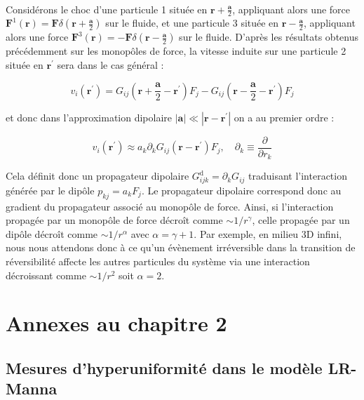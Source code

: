 \subparagraph{}Considérons le choc d'une particule 1 située en $\mathbf{r}+\frac{\mathbf{a}}{2}$, appliquant alors une force $\mathbf{F}^1(\mathbf{r})=\mathbf{F}\delta(\mathbf{r}+\frac{\mathbf{a}}{2})$ sur le fluide, et une particule 3 située en $\mathbf{r}-\frac{\mathbf{a}}{2}$, appliquant alors une force $\mathbf{F}^3(\mathbf{r})=-\mathbf{F}\delta(\mathbf{r}-\frac{\mathbf{a}}{2})$ sur le fluide. D'après les résultats obtenus précédemment sur les monopôles de force, la vitesse induite sur une particule 2 située en $\mathbf{r}^\prime$ sera dans le cas général :

\begin{equation}
	v_i (\mathbf{r}^\prime) = G_{ij}(\mathbf{r}+\frac{\mathbf{a}}{2} -\mathbf{r}^\prime)F_j - G_{ij}(\mathbf{r}-\frac{\mathbf{a}}{2} -\mathbf{r}^\prime)F_j
\end{equation}

\noindent et donc dans l'approximation dipolaire $|\mathbf{a}|\ll |\mathbf{r}-\mathbf{r}^\prime|$ on a au premier ordre :

\begin{equation}
	v_i (\mathbf{r}^\prime) \approx a_k\partial_k G_{ij}(\mathbf{r} -\mathbf{r}^\prime)F_j, \quad \partial_k \equiv \frac{\partial}{\partial r_k}
\end{equation}

\noindent Cela définit donc un propagateur dipolaire $G^\text{d}_{ijk} = \partial_kG_{ij}$ traduisant l'interaction générée par le dipôle $p_{kj} = a_kF_j$. Le propagateur dipolaire correspond donc au gradient du propagateur associé au monopôle de force. Ainsi, si l'interaction propagée par un monopôle de force décroît comme $\sim 1/r^\gamma$, celle propagée par un dipôle décroît comme $\sim 1/r^{\alpha}$ avec $\alpha = \gamma + 1$. Par exemple, en milieu 3D infini, nous nous attendons donc à ce qu'un évènement irréversible dans la transition de réversibilité affecte les autres particules du système via une interaction décroissant comme $\sim 1/r^2$ soit $\alpha = 2$.

\FloatBarrier

\chapter{Annexes au chapitre 2}

\section{Mesures d'hyperuniformité dans le modèle LR-Manna}

